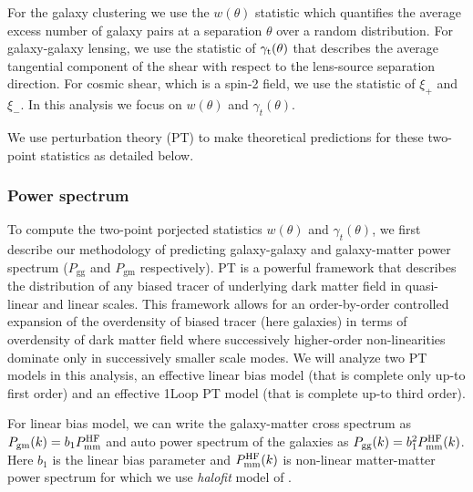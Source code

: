 \documentclass[fleqn,usenatbib]{mnras}
\newcommand{\gammat}{\ensuremath{\gamma_{t}(\theta)}}
\newcommand{\wtheta}{\ensuremath{w(\theta)}}
\newcommand{\pgg}{\ensuremath{P_{\mathrm{gg}}}}
\newcommand{\pgm}{\ensuremath{P_{\mathrm{gm}}}}
\begin{document}
For the galaxy clustering we use the $w(\theta)$ statistic which quantifies the average excess number of galaxy pairs at a separation $\theta$ over a random distribution. For galaxy-galaxy lensing, we use the statistic of $\gamma_{\rm t}(\theta)$ that describes the average tangential component of the shear with respect to the lens-source separation direction. For cosmic shear, which is a spin-2 field, we use the statistic of $\xi_{+}$ and $\xi_{-}$. In this analysis we focus on $\wtheta$ and $\gammat$. 

We use perturbation theory (PT) to make theoretical predictions for these two-point statistics as detailed below. 

\subsubsection{Power spectrum}
\label{sec:Pk_pred}

To compute the two-point porjected statistics $\wtheta$ and $\gammat$, we first describe our methodology of predicting galaxy-galaxy and galaxy-matter power spectrum ($\pgg$ and $\pgm$ respectively). PT is a powerful framework that describes the distribution of any biased tracer of underlying dark matter field in quasi-linear and linear scales. This framework allows for an order-by-order controlled expansion of the overdensity of biased tracer (here galaxies) in terms of overdensity of dark matter field where successively higher-order non-linearities dominate only in successively smaller scale modes. We will analyze two PT models in this analysis, an effective linear bias model (that is complete only up-to first order) and an effective 1Loop PT model (that is complete up-to third order). 

For linear bias model, we can write the galaxy-matter cross spectrum as $P_{\mathrm{gm}}(k) = b_1 P^{\rm HF}_{\mathrm{mm}}$ and auto power spectrum of the galaxies as $P_{\mathrm{gg}}(k) = b_1^2 P^{\rm HF}_{\mathrm{mm}}(k)$. Here $b_1$ is the linear bias parameter and $P^{\rm HF}_{\mathrm{mm}}(k)$ is non-linear matter-matter power spectrum for which we use \textit{halofit} model of \cite{Takahashi:2012em}. 
\end{document}
